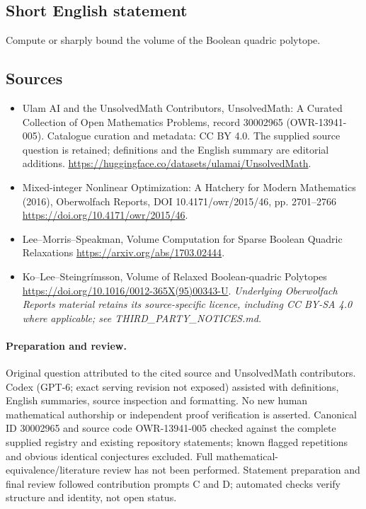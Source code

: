 \documentclass[11pt]{article}
\begin{document}
\subsection{Short English statement}
Compute or sharply bound the volume of the Boolean quadric polytope.
\subsection{Sources}
\begin{itemize}
\item[\hypertarget{source:30002965:1}{S1}] Ulam AI and the UnsolvedMath Contributors, UnsolvedMath: A Curated Collection of Open Mathematics Problems, record 30002965 (OWR-13941-005). Catalogue curation and metadata: CC BY 4.0. The supplied source question is retained; definitions and the English summary are editorial additions.
\url{https://huggingface.co/datasets/ulamai/UnsolvedMath}.
\item[\hypertarget{source:30002965:2}{S2}] Mixed-integer Nonlinear Optimization: A Hatchery for Modern Mathematics (2016), Oberwolfach Reports, DOI 10.4171/owr/2015/46, pp. 2701--2766
\url{https://doi.org/10.4171/owr/2015/46}.
\item[\hypertarget{source:30002965:3}{S3}] Lee--Morris--Speakman, Volume Computation for Sparse Boolean Quadric Relaxations
\url{https://arxiv.org/abs/1703.02444}.
\item[\hypertarget{source:30002965:4}{S4}] Ko--Lee--Steingrímsson, Volume of Relaxed Boolean-quadric Polytopes
\url{https://doi.org/10.1016/0012-365X(95)00343-U}.
\textit{Underlying Oberwolfach Reports material retains its source-specific licence, including CC BY-SA 4.0 where applicable; see THIRD\_PARTY\_NOTICES.md.}
\end{itemize}
\paragraph{Preparation and review.}
Original question attributed to the cited source and UnsolvedMath contributors. Codex (GPT-6; exact serving revision not exposed) assisted with definitions, English summaries, source inspection and formatting. No new human mathematical authorship or independent proof verification is asserted. Canonical ID 30002965 and source code OWR-13941-005 checked against the complete supplied registry and existing repository statements; known flagged repetitions and obvious identical conjectures excluded. Full mathematical-equivalence/literature review has not been performed. Statement preparation and final review followed contribution prompts C and D; automated checks verify structure and identity, not open status.
\label{end:30002965}
\end{document}
